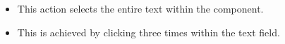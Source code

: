 \begin{itemize}
\item This action selects the entire text within the component.
\item This is achieved by clicking three times within the text field.
\end{itemize}
